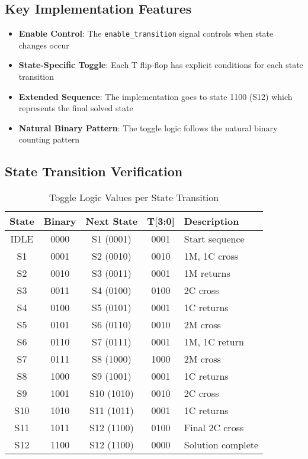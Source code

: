 \documentclass[10pt,a4paper]{article}
\begin{document}
\subsection*{Key Implementation Features}
\begin{itemize}
    \item \textbf{Enable Control}: The \texttt{enable\_transition} signal controls when state changes occur
    \item \textbf{State-Specific Toggle}: Each T flip-flop has explicit conditions for each state transition
    \item \textbf{Extended Sequence}: The implementation goes to state 1100 (S12) which represents the final solved state
    \item \textbf{Natural Binary Pattern}: The toggle logic follows the natural binary counting pattern
\end{itemize}

\subsection*{State Transition Verification}

\begin{table}[H]
\centering
\caption{Toggle Logic Values per State Transition}
\begin{tabular}{|c|c|c|c|l|}
\hline
\textbf{State} & \textbf{Binary} & \textbf{Next State} & \textbf{T[3:0]} & \textbf{Description} \\ \hline
IDLE  & 0000 & S1 (0001)   & 0001 & Start sequence \\
S1    & 0001 & S2 (0010)   & 0010 & 1M, 1C cross \\
S2    & 0010 & S3 (0011)   & 0001 & 1M returns \\
S3    & 0011 & S4 (0100)   & 0100 & 2C cross \\
S4    & 0100 & S5 (0101)   & 0001 & 1C returns \\
S5    & 0101 & S6 (0110)   & 0010 & 2M cross \\
S6    & 0110 & S7 (0111)   & 0001 & 1M, 1C return \\
S7    & 0111 & S8 (1000)   & 1000 & 2M cross \\
S8    & 1000 & S9 (1001)   & 0001 & 1C returns \\
S9    & 1001 & S10 (1010)  & 0010 & 2C cross \\
S10   & 1010 & S11 (1011)  & 0001 & 1C returns \\
S11   & 1011 & S12 (1100)  & 0100 & Final 2C cross \\
S12   & 1100 & S12 (1100)  & 0000 & Solution complete \\
\hline
\end{tabular}
\end{table}
\end{document}
